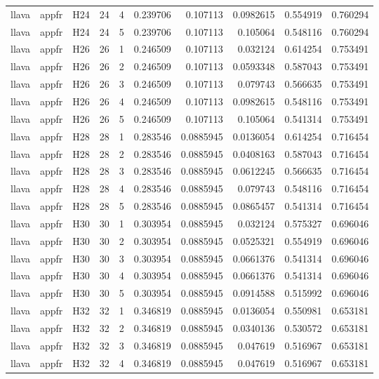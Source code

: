 \begin{longtable}{lllrrrrrrr}
llava & appfr & H24 & 24 & 4 & 0.239706 & 0.107113 & 0.0982615 & 0.554919 & 0.760294 \\
llava & appfr & H24 & 24 & 5 & 0.239706 & 0.107113 & 0.105064 & 0.548116 & 0.760294 \\
llava & appfr & H26 & 26 & 1 & 0.246509 & 0.107113 & 0.032124 & 0.614254 & 0.753491 \\
llava & appfr & H26 & 26 & 2 & 0.246509 & 0.107113 & 0.0593348 & 0.587043 & 0.753491 \\
llava & appfr & H26 & 26 & 3 & 0.246509 & 0.107113 & 0.079743 & 0.566635 & 0.753491 \\
llava & appfr & H26 & 26 & 4 & 0.246509 & 0.107113 & 0.0982615 & 0.548116 & 0.753491 \\
llava & appfr & H26 & 26 & 5 & 0.246509 & 0.107113 & 0.105064 & 0.541314 & 0.753491 \\
llava & appfr & H28 & 28 & 1 & 0.283546 & 0.0885945 & 0.0136054 & 0.614254 & 0.716454 \\
llava & appfr & H28 & 28 & 2 & 0.283546 & 0.0885945 & 0.0408163 & 0.587043 & 0.716454 \\
llava & appfr & H28 & 28 & 3 & 0.283546 & 0.0885945 & 0.0612245 & 0.566635 & 0.716454 \\
llava & appfr & H28 & 28 & 4 & 0.283546 & 0.0885945 & 0.079743 & 0.548116 & 0.716454 \\
llava & appfr & H28 & 28 & 5 & 0.283546 & 0.0885945 & 0.0865457 & 0.541314 & 0.716454 \\
llava & appfr & H30 & 30 & 1 & 0.303954 & 0.0885945 & 0.032124 & 0.575327 & 0.696046 \\
llava & appfr & H30 & 30 & 2 & 0.303954 & 0.0885945 & 0.0525321 & 0.554919 & 0.696046 \\
llava & appfr & H30 & 30 & 3 & 0.303954 & 0.0885945 & 0.0661376 & 0.541314 & 0.696046 \\
llava & appfr & H30 & 30 & 4 & 0.303954 & 0.0885945 & 0.0661376 & 0.541314 & 0.696046 \\
llava & appfr & H30 & 30 & 5 & 0.303954 & 0.0885945 & 0.0914588 & 0.515992 & 0.696046 \\
llava & appfr & H32 & 32 & 1 & 0.346819 & 0.0885945 & 0.0136054 & 0.550981 & 0.653181 \\
llava & appfr & H32 & 32 & 2 & 0.346819 & 0.0885945 & 0.0340136 & 0.530572 & 0.653181 \\
llava & appfr & H32 & 32 & 3 & 0.346819 & 0.0885945 & 0.047619 & 0.516967 & 0.653181 \\
llava & appfr & H32 & 32 & 4 & 0.346819 & 0.0885945 & 0.047619 & 0.516967 & 0.653181 \\

\end{longtable}
